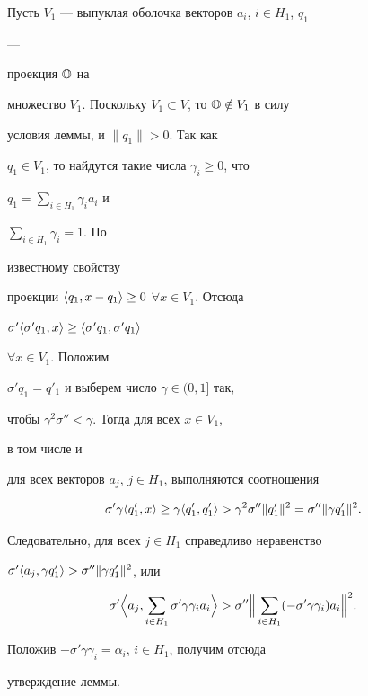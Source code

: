 \begin{pf}


Пусть $V_1$ --- выпуклая оболочка векторов $a_i$, $i\in H_1$, $q_1$


---


проекция $\Bbb O$ на


множество $V_1$. Поскольку $V_1\subset V$, то $\Bbb O\notin V_1$ в силу


условия леммы, и $\|q_1\|>0$. Так как


$q_1\in V_1$, то найдутся такие числа $\gamma_i\ge 0$, что


$q_1=\sum\limits_{i\in H_1}\gamma_ia_i$ и


$\sum\limits_{i\in H_1}\gamma_i=1$. По


известному свойству


проекции $\langle q_1,x-q_1\rangle\ge 0$ $\forall x\in V_1$. Отсюда


$\sigma'\langle\sigma' q_1,x\rangle\ge\langle\sigma' q_1,\sigma' q_1\rangle$


$\forall x\in V_1$. Положим


$\sigma' q_1=q'_1$ и выберем число $\gamma\in(0,1]$ так,


чтобы $\gamma^2\sigma''<\gamma$. Тогда для всех $x\in V_1$,


в том числе и


для всех векторов $a_j$, $j\in H_1$, выполняются соотношения


$$


\sigma'\gamma\la q'_1,x\ra\ge\gamma\la q'_1,q'_1\ra >


\gamma^2\sigma''\|q'_1\|^2=\sigma''\|\gamma q'_1\|^2.


$$


Следовательно, для всех $j\in H_1$ справедливо неравенство


$\sigma'\langle a_j,\gamma q'_1\rangle>\sigma''\|\gamma q'_1\|^2$, или


$$


\sigma'\Bigl\la a_j,\sum_{i\in H_1}\sigma'\gamma\gamma_ia_i


\Bigr\ra >\sigma''\Bigl\|\,\sum_{i\in H_1}(-\sigma'\gamma\gamma_i)


a_i\Bigr\|^2.


$$


Положив $-\sigma'\gamma\gamma_i=\alpha_i$, $i\in H_1$, получим отсюда


утверждение леммы.


\end{pf}





